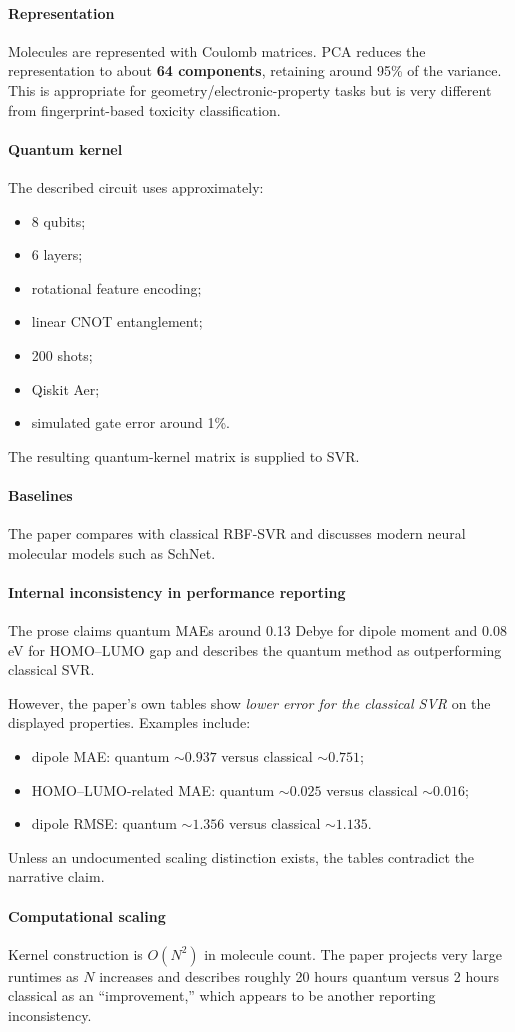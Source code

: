 \documentclass[11pt]{article}
\newcommand{\reviewfield}[2]{\paragraph{#1}#2}
\begin{document}
\reviewfield{Representation}{
Molecules are represented with Coulomb matrices. PCA reduces the representation to about \textbf{64 components}, retaining around 95\% of the variance. This is appropriate for geometry/electronic-property tasks but is very different from fingerprint-based toxicity classification.
}

\reviewfield{Quantum kernel}{
The described circuit uses approximately:
\begin{itemize}
    \item 8 qubits;
    \item 6 layers;
    \item rotational feature encoding;
    \item linear CNOT entanglement;
    \item 200 shots;
    \item Qiskit Aer;
    \item simulated gate error around 1\%.
\end{itemize}
The resulting quantum-kernel matrix is supplied to SVR.
}

\reviewfield{Baselines}{
The paper compares with classical RBF-SVR and discusses modern neural molecular models such as SchNet.
}

\reviewfield{Internal inconsistency in performance reporting}{
The prose claims quantum MAEs around 0.13 Debye for dipole moment and 0.08 eV for HOMO--LUMO gap and describes the quantum method as outperforming classical SVR.

However, the paper's own tables show \emph{lower error for the classical SVR} on the displayed properties. Examples include:
\begin{itemize}
    \item dipole MAE: quantum $\sim0.937$ versus classical $\sim0.751$;
    \item HOMO--LUMO-related MAE: quantum $\sim0.025$ versus classical $\sim0.016$;
    \item dipole RMSE: quantum $\sim1.356$ versus classical $\sim1.135$.
\end{itemize}
Unless an undocumented scaling distinction exists, the tables contradict the narrative claim.
}

\reviewfield{Computational scaling}{
Kernel construction is $O(N^2)$ in molecule count. The paper projects very large runtimes as $N$ increases and describes roughly 20 hours quantum versus 2 hours classical as an ``improvement,'' which appears to be another reporting inconsistency.
}
\end{document}
